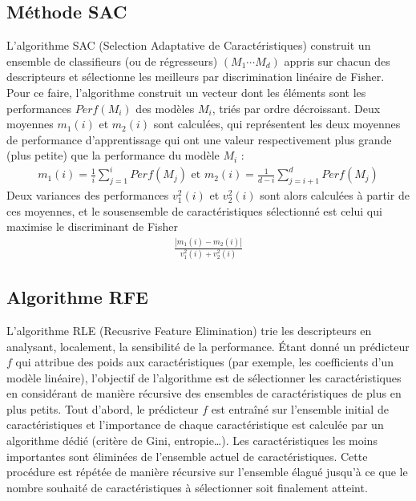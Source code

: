 \documentclass[letterpaper,10pt,english]{jupyterBook}
\begin{document}
\subsection{Méthode SAC}
\label{\detokenize{selection:methode-sac}}
\sphinxAtStartPar
L’algorithme SAC (Selection Adaptative de Caractéristiques)  construit un ensemble de classifieurs (ou de régresseurs) \((M_1\cdots M_d)\) appris sur chacun des descripteurs et sélectionne les meilleurs par discrimination linéaire de Fisher. Pour ce faire, l’algorithme construit un vecteur dont les éléments sont les performances \(Perf(M_i)\) des modèles \(M_i\), triés par ordre décroissant. Deux moyennes \(m_1(i)\) et \(m_2(i)\) sont calculées, qui représentent les deux moyennes de performance d’apprentissage qui ont une valeur respectivement plus grande (plus petite) que la performance du modèle \(M_i\) :
\begin{equation*}
\begin{split}m_1(i) = \frac{1}{i}\displaystyle\sum_{j=1}^i Perf (M_j)\textrm{ et } m_2(i) = \frac{1}{d-i}\displaystyle\sum_{j=i+1}^d Perf (M_j)\end{split}
\end{equation*}
\sphinxAtStartPar
Deux variances des performances  \(v_1^2(i)\) et \( v_2^2(i)\) sont alors calculées à partir de ces moyennes, et le sous\sphinxhyphen{}ensemble de caractéristiques sélectionné est celui qui maximise le discriminant de Fisher
\begin{equation*}
\begin{split}\frac{|m_1(i)-m_2(i)|}{v_1^2(i)+v_2^2(i)}\end{split}
\end{equation*}

\subsection{Algorithme RFE}
\label{\detokenize{selection:algorithme-rfe}}
\sphinxAtStartPar
L’algorithme RLE (Recusrive Feature Elimination) trie les descripteurs en analysant, localement, la sensibilité de la performance.
Étant donné un prédicteur \(f\) qui attribue des poids aux caractéristiques (par exemple, les coefficients d’un modèle linéaire), l’objectif de l’algorithme est de sélectionner les caractéristiques en considérant de manière récursive des ensembles de caractéristiques de plus en plus petits. Tout d’abord, le prédicteur \(f\) est entraîné sur l’ensemble initial de caractéristiques et l’importance de chaque caractéristique est calculée par un algorithme dédié (critère de Gini, entropie…). Les caractéristiques les moins importantes sont éliminées de l’ensemble actuel de caractéristiques. Cette procédure est répétée de manière récursive sur l’ensemble élagué jusqu’à ce que le nombre souhaité de caractéristiques à sélectionner soit finalement atteint.
\end{document}
